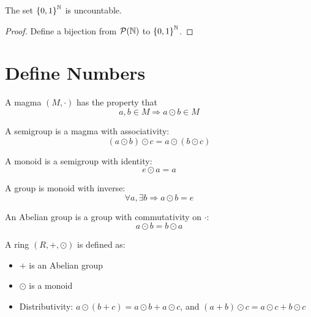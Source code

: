 \begin{theorem}
The set $\set{0,1}^{\mathbb{N}}$ is uncountable.
\end{theorem}
\begin{proof}
    Define a bijection from $\mathcal{P}(\mathbb{N})$ to $\set{0,1}^{\mathbb{N}}$.
\end{proof}


\section{Define Numbers}

%
%

\begin{definition}[magma]
    A magma $(M, \cdot)$ has the property that
    \begin{equation}
        a, b \in M \Rightarrow a \odot b \in M
    \end{equation}
\end{definition}

\begin{definition}[semigroup]
    A semigroup is a magma with associativity:
    \begin{equation}
        (a \odot b) \odot c = a \odot (b \odot c)
    \end{equation}
\end{definition}

\begin{definition}[monoid]
    A monoid is a semigroup with identity:
    \begin{equation}
        e \odot a = a
    \end{equation}
\end{definition}

\begin{definition}[group]
    A group is monoid with inverse:
    \begin{equation}
        \forall a, \exists b \Rightarrow a \odot b = e
    \end{equation}
\end{definition}

\begin{definition}
    An Abelian group is a group with commutativity on $\cdot$:
    \begin{equation}
        a \odot b = b \odot a
    \end{equation}
\end{definition}

\begin{definition}[ring]
    A ring $(R, +, \odot)$ is defined as:
    \begin{itemize}
        \item $+$ is an Abelian group
        \item $\odot$ is a monoid
        \item Distributivity: $a \odot (b + c) = a \odot b + a \odot c$, and $(a+b) \odot c = a \odot c + b \odot c$
    \end{itemize}
    
\end{definition}


